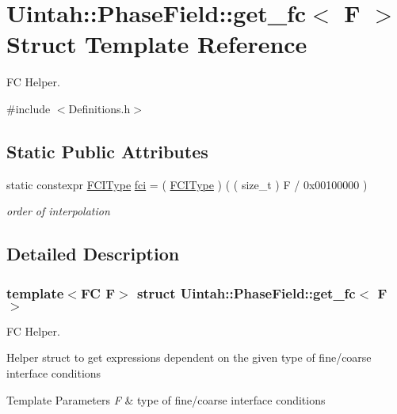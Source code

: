 \hypertarget{structUintah_1_1PhaseField_1_1get__fc}{}\section{Uintah\+:\+:Phase\+Field\+:\+:get\+\_\+fc$<$ F $>$ Struct Template Reference}
\label{structUintah_1_1PhaseField_1_1get__fc}


FC Helper.  




{\ttfamily \#include $<$Definitions.\+h$>$}

\subsection*{Static Public Attributes}
\begin{DoxyCompactItemize}
\item 
static constexpr \hyperlink{namespaceUintah_1_1PhaseField_a547ce3002aa97fbd3ef3192a6eec8406}{F\+C\+I\+Type} \hyperlink{structUintah_1_1PhaseField_1_1get__fc_af33cbd8423c89349aa148f6ef1d48012}{fci} = ( \hyperlink{namespaceUintah_1_1PhaseField_a547ce3002aa97fbd3ef3192a6eec8406}{F\+C\+I\+Type} ) ( ( size\+\_\+t ) F / 0x00100000 )
\begin{DoxyCompactList}\small\item\em order of interpolation \end{DoxyCompactList}\end{DoxyCompactItemize}


\subsection{Detailed Description}
\subsubsection*{template$<$FC F$>$\newline
struct Uintah\+::\+Phase\+Field\+::get\+\_\+fc$<$ F $>$}

FC Helper. 

Helper struct to get expressions dependent on the given type of fine/coarse interface conditions


\begin{DoxyTemplParams}{Template Parameters}
{\em F} & type of fine/coarse interface conditions \\
\hline
\end{DoxyTemplParams}


